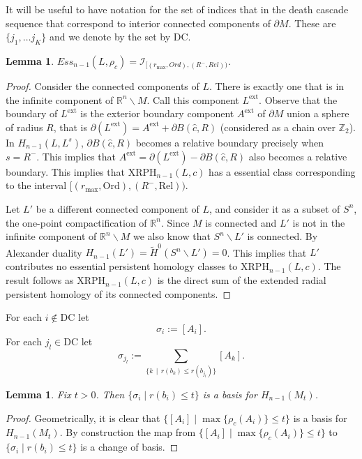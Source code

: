 \documentclass[a4paper,11pt]{article}
\newtheorem{lemma}[theorem]{Lemma}
\theoremstyle{definition}
\newcommand{\DC}{\text{DC}}
\newcommand{\R}{\mathbb{R}}
\begin{document}
It will be useful to have notation for the set of indices that in the death cascade sequence that correspond to interior connected components of $\partial M$. These are 
$\{j_1, \ldots j_{K}\}$ and we denote by the set by $\DC$. 

\begin{lemma}\label{lem:Ess_n-1(L)}
$Ess_{n-1}(L,\rho_c)=\mathcal{I}_{[(r_{\max}, Ord), (R^-,Rel))}$. 
\end{lemma}

\begin{proof}
Consider the connected components of $L$. There is exactly one that is in the infinite component of $\R^n\backslash M$. Call this component $L^{\text{ext}}$. Observe that the boundary of $L^{\text{ext}}$ is the exterior boundary component $A^{\text{ext}}$ of $\partial M$ union a sphere of radius $R$, that is $\partial (L^{\text{ext}})=A^{\text{ext}}+ \partial B(\hat{c}, R)$ (considered as a chain over $\mathbb{Z}_2$). In $H_{n-1}(L, L^s)$, $\partial B(\hat{c},R)$ becomes a relative boundary precisely when $s=R^-$. This implies that $A^{\text{ext}}=\partial (L^{\text{ext}})-\partial B(\hat{c}, R)$ also becomes a relative boundary. This implies that $\mathrm{XRPH}_{n-1}(L, c)$ has a essential class corresponding to the interval $[(r_{\max}, \mathrm{Ord}), (R^-, \mathrm{Rel}))$. 


Let $L'$ be a different connected component of $L$, and consider it as a subset of $S^n$, the one-point compactification of $\R^n$.  Since $M$ is connected and $L'$ is not in the infinite component of $\R^n\backslash M$ we also know that $S^n\backslash L'$ is connected. By Alexander duality $H_{n-1}(L')= \tilde{H}^0(S^n \backslash L')=0$. 
This implies that $L'$ contributes no essential persistent homology classes to $\mathrm{XRPH}_{n-1}(L, c)$. The result follows as $\mathrm{XRPH}_{n-1}(L,c)$ is the direct sum of the extended radial persistent homology of its connected components.
\end{proof}

For each $i\notin \DC$ let $$\sigma_i:=[A_i].$$ 
For each $j_l\in \DC$ let $$\sigma_{j_l}:=\sum_{\{k\,\mid \, r(b_k)\leq r(b_{j_l})\}}[A_k].$$ 


\begin{lemma}\label{lem:basis}
Fix $t>0$. Then $\{\sigma_i \mid r(b_i)\leq t\}$ is a basis for $H_{n-1}(M_t)$.
\end{lemma}
\begin{proof}
Geometrically, it is clear that $\{[A_i] \mid \max\{\rho_c(A_i)\}\leq t\}$ is a basis for $H_{n-1}(M_t)$. By construction the map from $\{[A_i] \mid \max\{\rho_c(A_i)\}\leq t\}$ to $\{\sigma_i \mid r(b_i)\leq t\}$ is a change of basis.
\end{proof}
\end{document}
